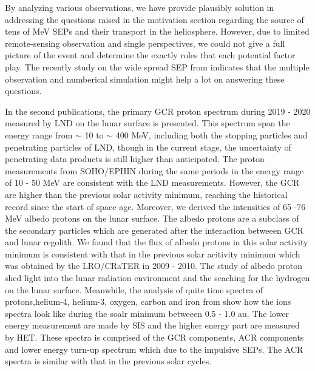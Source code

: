 By analyzing various observations, we have provide plausibly solution in addressing the questions raised in the motivation section regarding the source of tens of MeV \acp{SEP} and their transport in the heliosphere. However, due to limited remote-sensing observation and single perspectives, we could not give a full picture of the event and determine the exactly roles that each potential factor play.  The recently study on the wide spread SEP from \citet{dresing202317, Kolhoff2021AA} indicates that the multiple observation and numberical simulation might help a lot on answering these questions.

In the second publications, the primary \ac{GCR} proton spectrum during 2019 - 2020 measured by \ac{LND} on the lunar surface is presented. This spectrum span the energy range from $\sim$ 10 to $\sim$ 400 MeV, including both the stopping particles and penetrating particles of \ac{LND}, though in the current stage, the uncertainty of penetrating data products is still higher than anticipated. The proton measurements from \acs{SOHO}/\acs{EPHIN} during the same periods in the energy range of 10 - 50 MeV are consistent with the \ac{LND} measurements. However, the GCR are higher than the previous solar activity minimum, reaching the historical record since the start of space age.  Moreover, we derived the intensities of 65 -76 MeV albedo protons on the lunar surface. The albedo protons are a subclass of the secondary particles which are generated after the interaction betweeen \ac{GCR} and lunar regolith. We found that the flux of albedo protons in this solar activity minimum is consistent with that in the previous solar acitivity minimum which was obtained by the \acs{LRO}/\acs{CRaTER} in 2009 - 2010. The study of albedo proton shed light into the lunar radiation environment and the seaching for the hydrogen on the lunar surface. 
Meanwhile, the analysis of quite time spectra of protons,helium-4, helium-3, oxygen, carbon and iron from \citet{Mason-2021-SolOQuietTime} show how the ions spectra look like during the soalr minimum betweeen 0.5 - 1.0 au. The lower energy measurement are made by \acs{SIS} and the higher energy part are measured by \acs{HET}. These spectra is comprised of the GCR components, ACR components and lower energy turn-up spectrum which due to the impulsive \acp{SEP}. The ACR spectra is similar with that in the previous solar cycles. 

